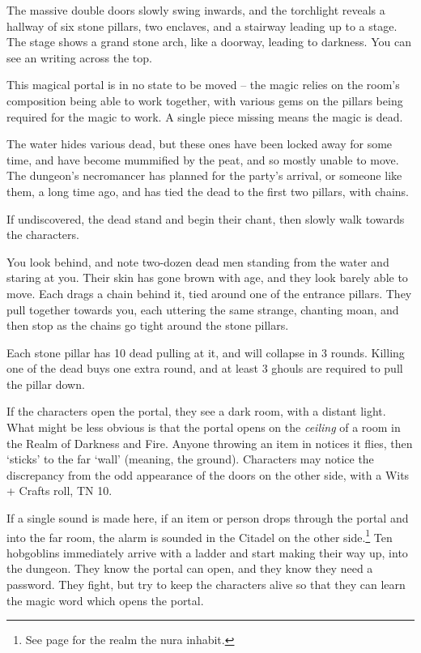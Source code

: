 \begin{multicols}{2}
\begin{boxtext}

	The massive double doors slowly swing inwards, and the torchlight reveals a hallway of six stone pillars, two enclaves, and a stairway leading up to a stage.  The stage shows a grand stone arch, like a doorway, leading to darkness.
	You can see an writing across the top.

\end{boxtext}

This magical portal is in no state to be moved -- the magic relies on the room's composition being able to work together, with various gems on the pillars being required for the magic to work.
A single piece missing means the magic is dead.

The water hides various dead, but these ones have been locked away for some time, and have become mummified by the peat, and so mostly unable to move.  The dungeon's necromancer has planned for the party's arrival, or someone like them, a long time ago, and has tied the dead to the first two pillars, with chains.

If undiscovered, the dead stand and begin their chant, then slowly walk towards the characters.

\begin{boxtext}
	You look behind, and note two-dozen dead men standing from the water and staring at you.
	Their skin has gone brown with age, and they look barely able to move.
	Each drags a chain behind it, tied around one of the entrance pillars.
	They pull together towards you, each uttering the same strange, chanting moan, and then stop as the chains go tight around the stone pillars.
\end{boxtext}

Each stone pillar has 10 dead pulling at it, and will collapse in 3 rounds.  Killing one of the dead buys one extra round, and at least 3 ghouls are required to pull the pillar down.

If the characters open the portal, they see a dark room, with a distant light.  What might be less obvious is that the portal opens on the \emph{ceiling} of a room in the Realm of Darkness and Fire.  Anyone throwing an item in notices it flies, then `sticks' to the far `wall' (meaning, the ground).  Characters may notice the discrepancy from the odd appearance of the doors on the other side, with a Wits + Crafts roll, TN 10.

If a single sound is made here, if an item or person drops through the portal and into the far room, the alarm is sounded in the Citadel on the other side.\footnote{See page \pageref{darknessandfire} for the realm the nura inhabit.}
Ten hobgoblins immediately arrive with a ladder and start making their way up, into the dungeon.
They know the portal can open, and they know they need a password.
They fight, but try to keep the characters alive so that they can learn the magic word which opens the portal.


\end{multicols}

